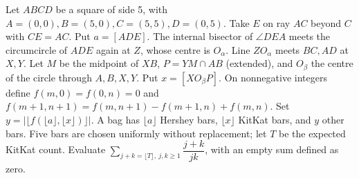 Let $ABCD$ be a square of side 5, with $A=(0,0),B=(5,0),C=(5,5),D=(0,5)$. Take $E$ on ray $AC$ beyond $C$ with $CE=AC$. Put $a=[ADE]$. The internal bisector of $\angle DEA$ meets the circumcircle of $ADE$ again at $Z$, whose centre is $O_\alpha$. Line $ZO_\alpha$ meets $BC,AD$ at $X,Y$. Let $M$ be the midpoint of $XB$, $P=YM\cap AB$ (extended), and $O_\beta$ the centre of the circle through $A,B,X,Y$. Put $x=[XO_\beta P]$. On nonnegative integers define $f(m,0)=f(0,n)=0$ and $f(m+1,n+1)=f(m,n+1)-f(m+1,n)+f(m,n)$. Set $y=|\lfloor f(\lfloor a\rfloor,\lfloor x\rfloor)\rfloor|$. A bag has $\lfloor a\rfloor$ Hershey bars, $\lfloor x\rfloor$ KitKat bars, and $y$ other bars. Five bars are chosen uniformly without replacement; let $T$ be the expected KitKat count. Evaluate $\sum_{j+k=\lfloor T\rfloor,\ j,k\ge1}\dfrac{j+k}{jk}$, with an empty sum defined as zero.
